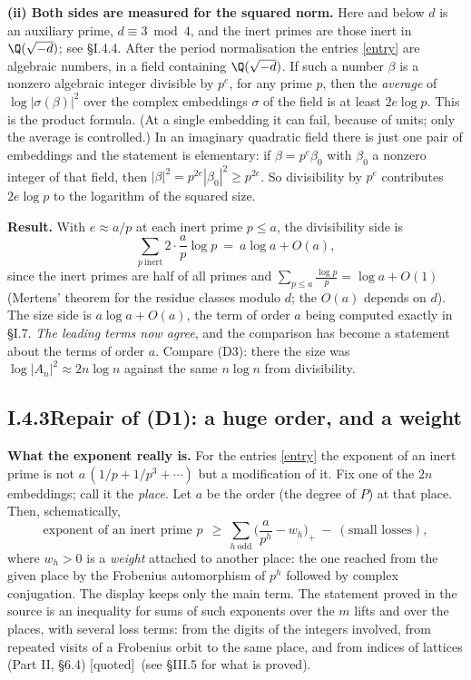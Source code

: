 \documentclass[11pt,letterpaper]{article}
\newcommand{\quoted}{\textsf{[quoted]}}
\begin{document}
\textbf{(ii) Both sides are measured for the squared norm.} Here and below $d$ is an auxiliary prime, $d\equiv3\bmod4$, and the inert primes are those inert in $\Q(\sqrt{-d})$; see \S I.4.4. After the period normalisation the
entries \eqref{entry} are algebraic numbers, in a field containing $\Q(\sqrt{-d})$. If such a number $\beta$
is a nonzero algebraic integer divisible by $p^e$, for any prime $p$, then the \emph{average} of
$\log|\sigma(\beta)|^2$ over the complex embeddings $\sigma$ of the field is at least $2e\log p$. This is the
product formula. (At a single embedding it can fail, because of units; only the average is controlled.) In
an imaginary quadratic field there is just one pair of embeddings and the statement is elementary: if
$\beta=p^e\beta_0$ with $\beta_0$ a nonzero integer of that field, then $|\beta|^2=p^{2e}|\beta_0|^2\ge p^{2e}$. So
divisibility by $p^e$ contributes $2e\log p$ to the logarithm of the squared size.

\textbf{Result.} With $e\approx a/p$ at each inert prime $p\le a$, the divisibility side is
\begin{equation}\label{D:18}
 \sum_{p\ \mathrm{inert}}2\cdot\frac ap\log p\ =\ a\log a+O(a),
\end{equation}
since the inert primes are half of all primes and $\sum_{p\le a}\frac{\log p}p=\log a+O(1)$ (Mertens'
theorem for the residue classes modulo $d$; the $O(a)$ depends on $d$). The size side is
$a\log a+O(a)$, the term of order $a$ being computed exactly in \S I.7. \emph{The leading terms now agree}, and the comparison has become a
statement about the terms of order $a$. Compare (D3): there the size was $\log|A_n|^2\approx2n\log n$
against the same $n\log n$ from divisibility.

\subsection*{I.4.3\quad Repair of (D1): a huge order, and a weight}

\textbf{What the exponent really is.} For the entries \eqref{entry} the exponent of an inert prime is not
$a\,(1/p+1/p^3+\cdots)$ but a modification of it. Fix one of the $2n$ embeddings; call it the
\emph{place}. Let $a$ be the order (the degree of $P$) at that place. Then, schematically,
\begin{equation}\label{expo}
 \text{exponent of an inert prime } p\ \ \ge\ \sum_{h\ \mathrm{odd}}\Big(\frac a{p^h}-w_h\Big)_+
 \ -\ (\text{small losses}),
\end{equation}
where $w_h>0$ is a \emph{weight} attached to another place: the one reached from the given place by the
Frobenius automorphism of $p^h$ followed by complex conjugation. The display keeps only the main term. The
statement proved in the source is an inequality for sums of such exponents over the $m$ lifts and over the
places, with several loss terms: from the digits of the integers involved, from repeated visits of a
Frobenius orbit to the same place, and from indices of lattices (Part II, \S6.4) \quoted\ (see \S III.5 for what is proved).
\end{document}
